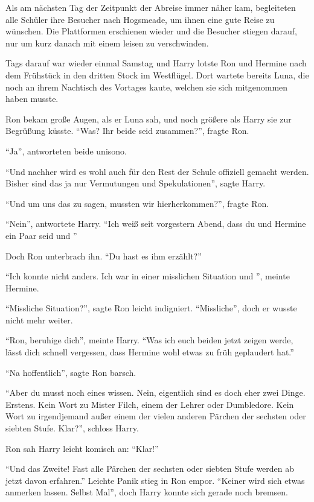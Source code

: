 Als am nächsten Tag der Zeitpunkt der Abreise immer näher kam, begleiteten alle Schüler ihre Besucher nach Hogsmeade, um ihnen eine gute Reise zu wünschen. Die Plattformen erschienen wieder und die Besucher stiegen darauf, nur um kurz danach mit einem leisen  zu verschwinden.

Tags darauf war wieder einmal Samstag und Harry lotste Ron und Hermine nach dem Frühstück in den dritten Stock im Westflügel. Dort wartete bereits Luna, die noch an ihrem Nachtisch des Vortages kaute, welchen sie sich mitgenommen haben musste.

Ron bekam große Augen, als er Luna sah, und noch größere als Harry sie zur Begrüßung küsste. \enquote{Was? Ihr beide seid zusammen?}, fragte Ron.

\enquote{Ja}, antworteten beide unisono.

\enquote{Und nachher wird es wohl auch für den Rest der Schule offiziell gemacht werden. Bisher sind das ja nur Vermutungen und Spekulationen}, sagte Harry.

\enquote{Und um uns das zu sagen, mussten wir hierherkommen?}, fragte Ron.

\enquote{Nein}, antwortete Harry. \enquote{Ich weiß seit vorgestern Abend, dass du und Hermine ein Paar seid und \gst}

Doch Ron unterbrach ihn. \enquote{Du hast es ihm erzählt?}

\enquote{Ich konnte nicht anders. Ich war in einer misslichen Situation und \gst}, meinte Hermine.

\enquote{Missliche Situation?}, sagte Ron leicht indigniert. \enquote{Missliche\abs}, doch er wusste nicht mehr weiter.

\enquote{Ron, beruhige dich}, meinte Harry. \enquote{Was ich euch beiden jetzt zeigen werde, lässt dich schnell vergessen, dass Hermine wohl etwas zu früh geplaudert hat.}

\enquote{Na hoffentlich}, sagte Ron barsch.

\enquote{Aber du musst noch eines wissen. Nein, eigentlich sind es doch eher zwei Dinge. Erstens. Kein Wort zu Mister Filch, einem der Lehrer oder Dumbledore. Kein Wort zu irgendjemand außer einem der vielen anderen Pärchen der sechsten oder siebten Stufe. Klar?}, schloss Harry.

Ron sah Harry leicht komisch an: \enquote{Klar!}

\enquote{Und das Zweite! Fast alle Pärchen der sechsten oder siebten Stufe werden ab jetzt davon erfahren.} Leichte Panik stieg in Ron empor. \enquote{Keiner wird sich etwas anmerken lassen. Selbst Mal\aabs}, doch Harry konnte sich gerade noch bremsen.

